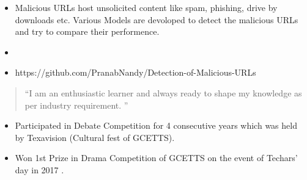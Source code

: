 \documentclass[10pt,a4paper,ragged2e,withhyper]{altacv}
\begin{document}
\begin{paracol}{2}
\divider

\begin{itemize}
	\item Malicious URLs host unsolicited
	content like spam, phishing, drive by downloads etc. Various Models are devoloped to detect the malicious URLs and try to compare their performence. 
	\item
	\item https://github.com/PranabNandy/Detection-of-Malicious-URLs
\end{itemize}



\switchcolumn

\begin{quote}
``I am an enthusiastic learner and always ready to shape my knowledge as per industry requirement. ''
\end{quote}



\divider


\divider




\divider



\begin{itemize}
\item Participated in Debate Competition for 4 consecutive years which was held by Texavision (Cultural fest of GCETTS).      

\item Won 1st Prize in Drama Competition of GCETTS on the event of Techars' day in 2017 . 
\end{itemize}




\end{paracol}
\end{document}
